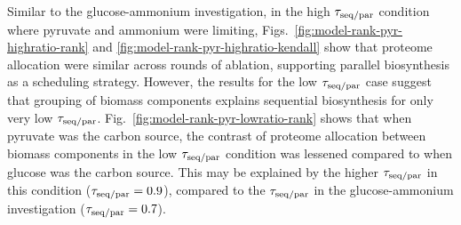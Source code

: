 Similar to the glucose-ammonium investigation, in the high $\tau_{\mathrm{seq}/\mathrm{par}}$ condition where pyruvate and ammonium were limiting, Figs.\ \ref{fig:model-rank-pyr-highratio-rank} and \ref{fig:model-rank-pyr-highratio-kendall} show that proteome allocation were similar across rounds of ablation, supporting parallel biosynthesis as a scheduling strategy.
However, the results for the low $\tau_{\mathrm{seq}/\mathrm{par}}$ case suggest that grouping of biomass components explains sequential biosynthesis for only very low $\tau_{\mathrm{seq}/\mathrm{par}}$.
Fig.\ \ref{fig:model-rank-pyr-lowratio-rank} shows that when pyruvate was the carbon source, the contrast of proteome allocation between biomass components in the low $\tau_{\mathrm{seq}/\mathrm{par}}$ condition was lessened compared to when glucose was the carbon source.
This may be explained by the higher $\tau_{\mathrm{seq}/\mathrm{par}}$ in this condition ($\tau_{\mathrm{seq}/\mathrm{par}} = 0.9$), compared to the $\tau_{\mathrm{seq}/\mathrm{par}}$ in the glucose-ammonium investigation ($\tau_{\mathrm{seq}/\mathrm{par}} = 0.7$).

